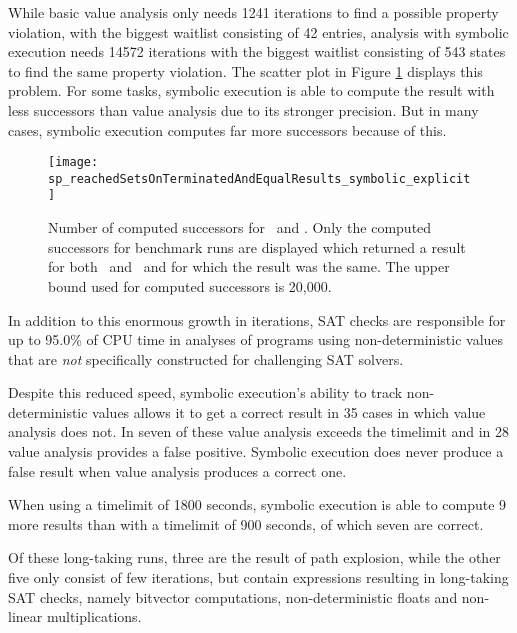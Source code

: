 While basic value analysis only needs 1241 iterations to find a possible property violation, with the biggest waitlist consisting of 42 entries,
analysis with symbolic execution needs 14572 iterations with the biggest waitlist consisting of 543 states to find the same property violation.
The scatter plot in Figure \ref{graph:computedSuccessors} displays this problem.
For some tasks, symbolic execution is able to compute the result with less successors than value analysis due to its stronger precision. But in many cases, symbolic execution computes far more successors because of this.
\begin{figure}
\texttt{[image: sp\_reachedSetsOnTerminatedAndEqualResults\_symbolic\_explicit]}
\caption{Number of computed successors for \ and \symbolicExecutionCPA.
         Only the computed successors for benchmark runs are displayed which returned a result for both \symbolicExecutionCPA\ and \ and for which the result was the same. The upper bound used for computed successors is 20,000.}
\label{graph:computedSuccessors}
\end{figure}
In addition to this enormous growth in iterations, SAT checks are responsible for up to 95.0\% of CPU time in analyses of programs using non-deterministic values that are \emph{not} specifically constructed for challenging SAT solvers.

Despite this reduced speed, symbolic execution's ability to track non-deterministic values allows it to get a correct result in 35 cases in which value analysis does not. In seven of these value analysis exceeds the timelimit and in 28 value analysis provides a false positive. Symbolic execution does never produce a false result when value analysis produces a correct one.

When using a timelimit of 1800 seconds, symbolic execution is able to compute 9 more results than with a timelimit of 900 seconds, of which seven are correct.

Of these long-taking runs, three are the result of path explosion,
while the other five only consist of few iterations, but contain expressions resulting in long-taking SAT checks, namely bitvector computations, non-deterministic floats and non-linear multiplications.

